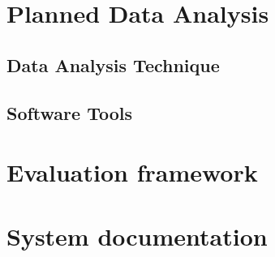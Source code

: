 

\section{Planned Data Analysis}
\label{sec:plannedDataAnalysis}




\subsection{Data Analysis Technique}
\label{sec:dataAnalysisTechnique}


\subsection{Software Tools}
\label{sec:softwareTools}




\section{Evaluation framework}
\label{sec:evaluationFramework}




\section{System documentation}
\label{sec:systemDocumentation}








\cleardoublepage
